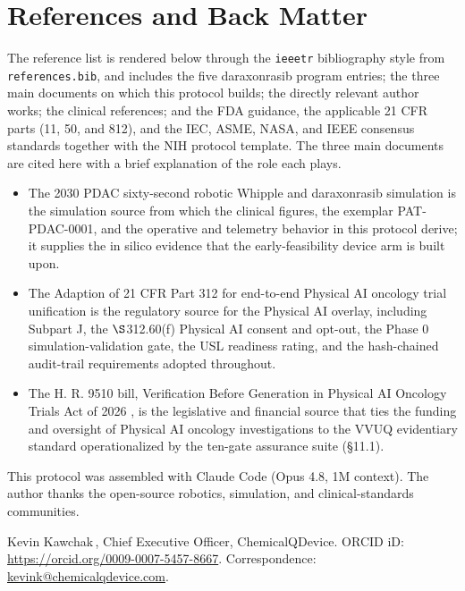 \section{References and Back Matter}

The reference list is rendered below through the \texttt{ieeetr} bibliography
style from \texttt{references.bib}, and includes the five daraxonrasib program
entries; the three main documents on which this protocol builds; the directly
relevant author works; the clinical references; and the FDA guidance, the
applicable 21 CFR parts (11, 50, and 812), and the IEC, ASME, NASA, and IEEE
consensus standards together with the NIH protocol template. The three main
documents are cited here with a brief explanation of the role each plays.

\begin{itemize}[leftmargin=1.6em,itemsep=3pt,topsep=2pt]
\item The 2030 PDAC sixty-second robotic Whipple and daraxonrasib simulation
\cite{kawchak_2026_20196639} is the simulation source from which the clinical
figures, the exemplar PAT-PDAC-0001, and the operative and telemetry behavior in
this protocol derive; it supplies the in silico evidence that the early-feasibility
device arm is built upon.
\item The Adaption of 21 CFR Part 312 for end-to-end Physical AI oncology trial
unification \cite{kawchak2026adapt312} is the regulatory source for the Physical AI
overlay, including Subpart J, the $\S$312.60(f) Physical AI consent and opt-out,
the Phase 0 simulation-validation gate, the USL readiness rating, and the
hash-chained audit-trail requirements adopted throughout.
\item The H. R. 9510 bill, Verification Before Generation in Physical AI Oncology
Trials Act of 2026 \cite{kawchak2026hr9510}, is the legislative and financial
source that ties the funding and oversight of Physical AI oncology investigations
to the VVUQ evidentiary standard operationalized by the ten-gate assurance suite
(\S11.1).
\end{itemize}

This protocol was assembled with Claude Code (Opus 4.8, 1M context). The author
thanks the open-source robotics, simulation, and clinical-standards communities.

Kevin Kawchak\,, Chief Executive Officer,
ChemicalQDevice. ORCID iD: \href{https://orcid.org/0009-0007-5457-8667}{https://orcid.org/0009-0007-5457-8667}.
Correspondence: \href{mailto:kevink@chemicalqdevice.com}{kevink@chemicalqdevice.com}.

